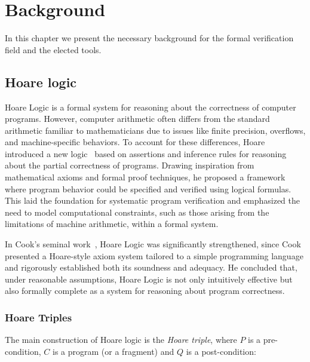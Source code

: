 
%


\chapter{Background}
\label{cha:Background}

In this chapter we present the necessary background for the formal verification field and the elected tools.

\section{Hoare logic}
\label{sec:Hoare_logic}

Hoare Logic is a formal system for reasoning about the correctness of computer programs. However, 
computer arithmetic often differs from the standard arithmetic familiar to mathematicians due to issues like finite 
precision, overflows, and machine-specific behaviors. To account for these differences, Hoare introduced a new logic~\cite{Hoare69}
based on assertions and inference rules for reasoning about the partial correctness of programs. Drawing inspiration 
from mathematical axioms and formal proof techniques, he proposed a framework where program behavior could be specified 
and verified using logical formulas. This laid the foundation for systematic program verification and emphasized the need 
to model computational constraints, such as those arising from the limitations of machine arithmetic, within a formal system.

In Cook's seminal work~\cite{0207005}, Hoare Logic was significantly strengthened, since Cook presented a Hoare-style axiom system 
tailored to a simple programming language and rigorously established both its soundness and adequacy. He concluded that, under 
reasonable assumptions, Hoare Logic is not only intuitively effective but also formally complete as a system for reasoning about 
program correctness.

\subsection{Hoare Triples}

The main construction of Hoare logic is the \textit{Hoare triple}, where $P$ is a pre-condition, $C$ is a program (or a fragment)
and $Q$ is a post-condition:

